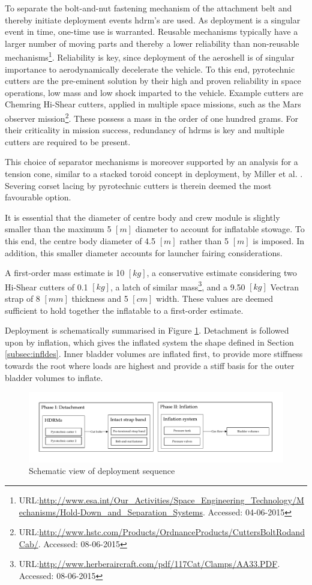 To separate the bolt-and-nut fastening mechanism of the attachment belt and thereby initiate deployment events \gls{hdrm}'s are used. As deployment is a singular event in time, one-time use is warranted. Reusable mechanisms typically have a larger number of moving parts and thereby a lower reliability than non-reusable mechanisms\footnote{URL:\url{http://www.esa.int/Our_Activities/Space_Engineering_Technology/Mechanisms/Hold-Down_and_Separation_Systems}. Accessed: 04-06-2015}. Reliability is key, since deployment of the aeroshell is of singular importance to aerodynamically decelerate the vehicle. To this end, pyrotechnic cutters are the pre-eminent solution by their high and proven reliability in space operations, low mass and low shock imparted to the vehicle. Example cutters are Chemring Hi-Shear cutters, applied in multiple space missions, such as the Mars observer mission\footnote{URL:\url{http://www.hstc.com/Products/OrdnanceProducts/CuttersBoltRodandCab/}. Accessed: 08-06-2015}. These possess a mass in the order of one hundred grams. For their criticality in mission success, redundancy of \glspl{hdrm} is key and multiple cutters are required to be present. 

This choice of separator mechanisms is moreover supported by an analysis for a tension cone, similar to a stacked toroid concept in deployment, by Miller et al. \cite{Miller2014}. Severing corset lacing by pyrotechnic cutters is therein deemed the most favourable option.


It is essential that the diameter of centre body and crew module is slightly smaller than the maximum 5 $[m]$ diameter to account for inflatable stowage. To this end, the centre body diameter of 4.5 $[m]$ rather than 5 $[m]$ is imposed. In addition, this smaller diameter accounts for launcher fairing considerations.


A first-order mass estimate is 10 $[kg]$, a conservative estimate considering two Hi-Shear cutters of 0.1 $[kg]$, a latch of similar mass\footnote{URL:\url{http://www.herberaircraft.com/pdf/117Cat/Clamps/AA33.PDF}. Accessed: 08-06-2015}, and a 9.50 $[kg]$ Vectran strap of 8 $[mm]$ thickness and 5 $[cm]$ width. These values are deemed sufficient to hold together the inflatable to a first-order estimate.

Deployment is schematically summarised in Figure \ref{fig:deplflow}. Detachment is followed upon by inflation, which gives the inflated system the shape defined in Section \ref{subsec:infldes}. Inner bladder volumes are inflated first, to provide more stiffness towards the root where loads are highest and provide a stiff basis for the outer bladder volumes to inflate.

\begin{figure}[h]
		\centering
		\includegraphics[width=1.0\textwidth]{./Figure/Structure/Deployment.pdf}
		\caption{Schematic view of deployment sequence}
		\label{fig:deplflow}
\end{figure}